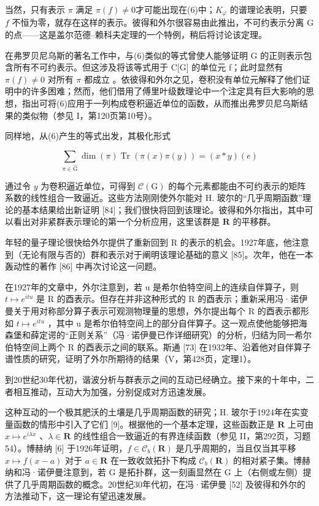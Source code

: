 当然，只有表示 \(\pi\) 满足 \(\pi(f) \neq 0\)才可能出现在(6)中；\(K_{\varphi}\) 的谱理论表明，只要 \(f\) 不恒为零，就存在这样的表示。彼得和外尔很容易由此推出，不可约表示分离 G 的点——这是盖尔范德--赖科夫定理的一个特例，稍后将讨论该定理。

在弗罗贝尼乌斯的著名工作中，与(6)类似的等式曾使人能够证明 G 的正则表示包含所有不可约表示。但这涉及将该等式用于 C{[}G{]} 的单位元 f；此时显然有 \(\pi(f) \neq 0\) 对所有 \(\pi\) 都成立 。依彼得和外尔之见，卷积没有单位元解释了他们证明中的许多困难；然而，他们借用了傅里叶级数理论中一个注定具有巨大影响的思想，指出可将(6)应用于一列构成卷积逼近单位的函数，从而推出弗罗贝尼乌斯结果的类似物（参见 I，第120页第10号）。

同样地，从(6)产生的等式出发，其极化形式

\[
\sum_ {\pi \in \widehat {\mathrm{G}}} \dim (\pi) \operatorname{Tr} (\pi (x) \pi (y)) = (x * y) (e)\tag{7}
\]

通过令 \(y\) 为卷积逼近单位，可得到 \(\mathcal{C}(\mathrm{G})\) 的每个元素都能由不可约表示的矩阵系数的线性组合一致逼近。这些方法刚刚使外尔能对 H. 玻尔的“几乎周期函数”理论的基本结果给出新证明 {[}84{]}；我们很快将回到该理论。彼得和外尔指出，其中可以看出对非紧群表示理论的第一个分析应用，这里该群是 \(\mathbf{R}\) 的平移群。

年轻的量子理论很快给外尔提供了重新回到 R 的表示的机会。1927年底，他注意到（无论有限与否的）群和表示对于阐明该理论基础的意义 {[}85{]}。次年，他在一本轰动性的著作 {[}86{]} 中再次讨论这一问题。

在1927年的文章中，外尔注意到，若 u 是希尔伯特空间上的连续自伴算子，则 \(t \mapsto e^{itu}\) 是 R 的酉表示。但存在并非这种形式的 R 的酉表示；重新采用冯·诺伊曼关于用对称部分算子表示可观测物理量的思想，外尔提出每个 R 的酉表示都形如 \(t \mapsto e^{itu}\) ，其中 u 是希尔伯特空间上的部分自伴算子。这一观点使他能够把海森堡和薛定谔的“正则关系”（冯·诺伊曼已作详细研究）的分析，归结为同一希尔伯特空间上两个 R 的酉表示之间的联系。斯通 {[}73{]} 在1932年、沿着他对自伴算子谱性质的研究，证明了外尔所期待的结果（V，第428页，定理1）。


到20世纪30年代初，谐波分析与群表示之间的互动已经确立。接下来的十年中，二者相互推动，互动大为加强，分别促成对方迅速发展。

这种互动的一个极其肥沃的土壤是几乎周期函数的研究；H. 玻尔于1924年在实变量函数的情形中引入了它们 {[}9{]}。根据他的一个基本定理，这些函数正是 \(\mathbf{R}\) 上可由 \(x \mapsto e^{i\lambda x}\) 、\(\lambda \in \mathbf{R}\) 的线性组合一致逼近的有界连续函数（参见 II，第292页，习题54）。博赫纳 {[}6{]} 于1926年证明，\(f \in \mathcal{C}_b(\mathbf{R})\) 是几乎周期的，当且仅当其平移 \(x \mapsto f(x - a)\) 对于 \(a \in \mathbf{R}\) 在一致收敛拓扑下构成 \(\mathcal{C}_b(\mathbf{R})\) 的相对紧子集。博赫纳和冯·诺伊曼注意到，若 G 是拓扑群，这一刻画显然在 G 上（右侧或左侧）提供了几乎周期函数的概念。20世纪30年代初，在冯·诺伊曼 {[}52{]} 及彼得和外尔的方法推动下，这一理论有望迅速发展。

